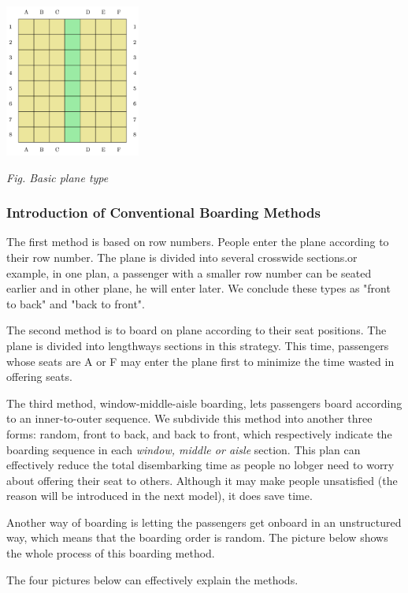 \documentclass{article}
\theoremstyle{definition}
\theoremstyle{remark}
\numberwithin{equation}{section}
\begin{document}
	\begin{center}
		\includegraphics[height=5cm]{planeempty.jpg}
		
		\small \textit{Fig. Basic plane type}
	\end{center}

	\subsubsection{Introduction of Conventional Boarding Methods}
	The first method is based on row numbers. People enter the plane according to their row number. The plane is divided into several crosswide sections.or example, in one plan, a passenger with a smaller row number can be seated earlier and in other plane, he will enter later. We conclude these types as "front to back" and "back to front".
	
	The second method is to board on plane according to their seat positions. The plane is divided into lengthways sections in this strategy. This time, passengers whose seats are A or F may enter the plane first to minimize the time wasted in offering seats.

	The third method, window-middle-aisle boarding, lets passengers board according to an inner-to-outer sequence. We subdivide this method into another three forms: random, front to back, and back to front, which respectively indicate the boarding sequence in each \textit{window, middle or aisle} section. This plan can effectively reduce the total disembarking time as people no lobger need to worry about offering their seat to others. Although it may make people unsatisfied (the reason will be introduced in the next model), it does save time.

	Another way of boarding is letting the passengers get onboard in an unstructured way, which means that the boarding order is random. The picture below shows the whole process of this boarding method.

	The four pictures below can effectively explain the methods.
	
\end{document}
